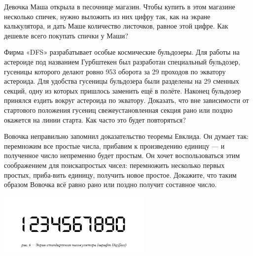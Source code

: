 \begin{itemize}
\itA Девочка Маша открыла в песочнице магазин. Чтобы купить в этом магазине несколько спичек, нужно выложить из них цифру так, как на экране калькулятора, и дать Маше количество листочков, равное этой цифре. Как дешевле всего покупать спички у Маши?

\itB Фирма «DFS» разрабатывает особые космические бульдозеры. Для работы на астероиде под названием Гурбштекен был разработан специальный бульдозер, гусеницы которого делают ровно 953 оборота за 29 проходов по экватору астероида. Для удобства гусеницы бульдозера были разделены на 29 сменных секций, одну из которых пришлось заменить ещё в полёте. Наконец бульдозер принялся ездить вокруг астероида по экватору. Доказать, что вне зависимости от стартового положения гусениц свежеустановленная секция рано или поздно окажется на линии старта. Как часто это будет повторяться?

\itC Вовочка неправильно запомнил доказательство теоремы Евклида. Он думает так: перемножим все простые числа, прибавим к произведению единицу --- и полученное число непременно будет простым. Он хочет воспользоваться этим соображением для поиска\linebreak простых чисел: перемножить несколько первых простых, приба-\linebreak вить единицу, получить новое простое. Докажите, что таким образом Вовочка всё равно рано или поздно получит составное число.
\end{itemize}

\begin{center}
  \includegraphics[width=7.5cm]{stats/2016/Figures/Digiface.png}
\end{center}
